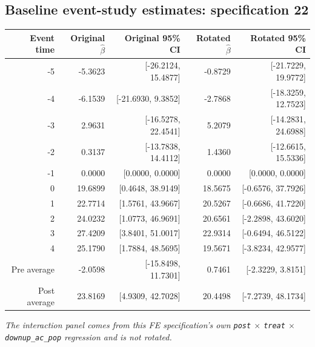 \documentclass[10pt]{article}
\begin{document}
\subsection*{Baseline event-study estimates: specification 22}
\begin{center}
\scriptsize
\begin{tabular}{r rr rr}
\toprule
Event time & Original $\hat\beta$ & Original 95\% CI & Rotated $\hat\beta$ & Rotated 95\% CI \\
\midrule
-5 & -5.3623 & [-26.2124, 15.4877] & -0.8729 & [-21.7229, 19.9772] \\
-4 & -6.1539 & [-21.6930, 9.3852] & -2.7868 & [-18.3259, 12.7523] \\
-3 & 2.9631 & [-16.5278, 22.4541] & 5.2079 & [-14.2831, 24.6988] \\
-2 & 0.3137 & [-13.7838, 14.4112] & 1.4360 & [-12.6615, 15.5336] \\
-1 & 0.0000 & [0.0000, 0.0000] & 0.0000 & [0.0000, 0.0000] \\
0 & 19.6899 & [0.4648, 38.9149] & 18.5675 & [-0.6576, 37.7926] \\
1 & 22.7714 & [1.5761, 43.9667] & 20.5267 & [-0.6686, 41.7220] \\
2 & 24.0232 & [1.0773, 46.9691] & 20.6561 & [-2.2898, 43.6020] \\
3 & 27.4209 & [3.8401, 51.0017] & 22.9314 & [-0.6494, 46.5122] \\
4 & 25.1790 & [1.7884, 48.5695] & 19.5671 & [-3.8234, 42.9577] \\
\midrule
Pre average & -2.0598 & [-15.8498, 11.7301] & 0.7461 & [-2.3229, 3.8151] \\
Post average & 23.8169 & [4.9309, 42.7028] & 20.4498 & [-7.2739, 48.1734] \\
\bottomrule
\end{tabular}
\end{center}
\medskip
\textit{The interaction panel comes from this FE specification's own \texttt{post} $\times$ \texttt{treat} $\times$ \texttt{downup\_ac\_pop} regression and is not rotated.}
\clearpage
\end{document}
